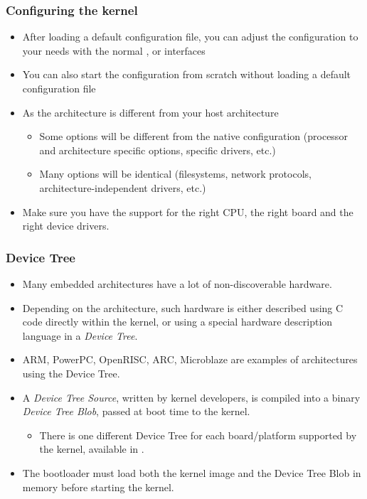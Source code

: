 \begin{frame}
  \frametitle{Configuring the kernel}
  \begin{itemize}
  \item After loading a default configuration file, you can adjust the
    configuration to your needs with the normal ,
     or  interfaces
  \item You can also start the configuration from scratch without
    loading a default configuration file
  \item As the architecture is different from your host architecture
    \begin{itemize}
    \item Some options will be different from the native configuration
      (processor and architecture specific options, specific drivers,
      etc.)
    \item Many options will be identical (filesystems, network
      protocols, architecture-independent drivers, etc.)
    \end{itemize}
  \item Make sure you have the support for the right CPU, the right
    board and the right device drivers.
  \end{itemize}
\end{frame}

\begin{frame}
  \frametitle{Device Tree}
  \begin{itemize}
  \item Many embedded architectures have a lot of non-discoverable
    hardware.
  \item Depending on the architecture, such hardware is either
    described using C code directly within the kernel, or using a
    special hardware description language in a {\em Device Tree}.
  \item ARM, PowerPC, OpenRISC, ARC, Microblaze are examples of
    architectures using the Device Tree.
  \item A {\em Device Tree Source}, written by kernel developers,
    is compiled into a binary {\em Device Tree Blob}, passed at boot
    time to the kernel.
    \begin{itemize}
    \item There is one different Device Tree for each board/platform
      supported by the kernel, available in
      .
    \end{itemize}
  \item The bootloader must load both the kernel image and the Device
    Tree Blob in memory before starting the kernel.
  \end{itemize}
\end{frame}

